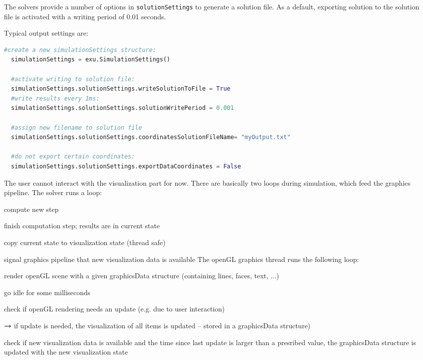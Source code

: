 %
The solvers provide a number of options in \texttt{solutionSettings} to generate a solution file. As a default, exporting solution to the solution file is activated with a writing period of 0.01 seconds.

Typical output settings are:
\pythonstyle
\begin{lstlisting}[language=Python, firstnumber=1]
  #create a new simulationSettings structure:
  simulationSettings = exu.SimulationSettings()
	
  #activate writing to solution file:
  simulationSettings.solutionSettings.writeSolutionToFile = True
  #write results every 1ms:
  simulationSettings.solutionSettings.solutionWritePeriod = 0.001
  
  #assign new filename to solution file
  simulationSettings.solutionSettings.coordinatesSolutionFileName= "myOutput.txt"

  #do not export certain coordinates:
  simulationSettings.solutionSettings.exportDataCoordinates = False
\end{lstlisting}


The user cannot interact with the visualization part for now.
There are basically two loops during simulation, which feed the graphics pipeline.
The solver runs a loop:
\bi
  \item compute new step
	\item finish computation step; results are in current state
	\item copy current state to visualization state (thread safe)
	\item signal graphics pipeline that new visualization data is available
\ei
The openGL graphics thread runs the following loop:
\bi
  \item render openGL scene with a given graphicsData structure (containing lines, faces, text, ...)
  \item go idle for some milliseconds
	\item check if openGL rendering needs an update (e.g. due to user interaction)
	\item[] $\rightarrow$ if update is needed, the visualization of all items is updated -- stored in a graphicsData structure)
	\item check if new visualization data is available and the time since last update is larger than a presribed value, the graphicsData structure is updated with the new visualization state
\ei

